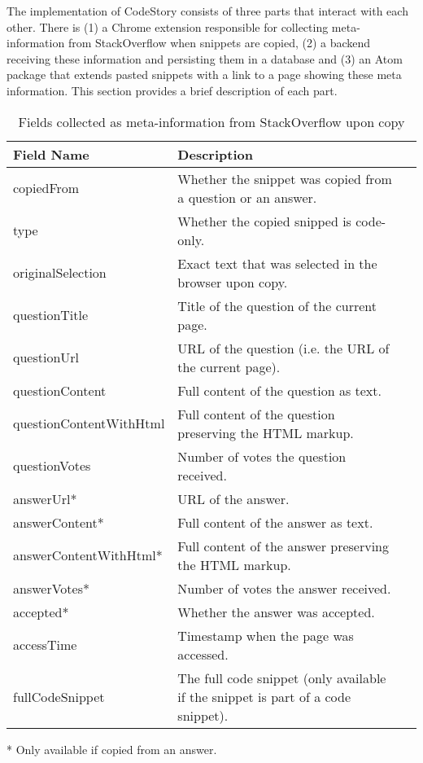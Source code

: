 \documentclass[../manifest.tex]{subfiles}
\begin{document}
The implementation of CodeStory consists of three parts that interact with each other. There is (1) a Chrome extension responsible for collecting meta-information from StackOverflow when snippets are copied, (2) a backend receiving these information and persisting them in a database and (3) an Atom package that extends pasted snippets with a link to a page showing these meta information. This section provides a brief description of each part.

\begin{table*}[t]
    \caption{Fields collected as meta-information from StackOverflow upon copy}
    \label{tab:chrome-extension-fields}
    \centering
    \begin{threeparttable}
    \begin{tabular*}{\textwidth}{lll}
    \hline
    \textbf{Field Name} & \textbf{Description} \\
    \hline
    copiedFrom 					& Whether the snippet was copied from a question or an answer.\\
    type 						& Whether the copied snipped is code-only.\\
    originalSelection 			& Exact text that was selected in the browser upon copy.\\
    questionTitle 				& Title of the question of the current page.\\
    questionUrl      			& URL of the question (i.e. the URL of the current page).\\
    questionContent     		& Full content of the question as text.\\
    questionContentWithHtml     & Full content of the question preserving the HTML markup.\\
    questionVotes				& Number of votes the question received.\\
    answerUrl* 					& URL of the answer.\\
    answerContent*    			& Full content of the answer as text.\\
    answerContentWithHtml*		& Full content of the answer preserving the HTML markup.\\
    answerVotes*    			& Number of votes the answer received.\\
    accepted*					& Whether the answer was accepted.\\
    accessTime    				& Timestamp when the page was accessed.\\
    fullCodeSnippet    			& The full code snippet (only available if the snippet is part of a code snippet).\\
    \hline
    \end{tabular*}
    \begin{tablenotes}\footnotesize
        \item [*] Only available if copied from an answer.
    \end{tablenotes}
    \end{threeparttable}
\end{table*}
\end{document}
